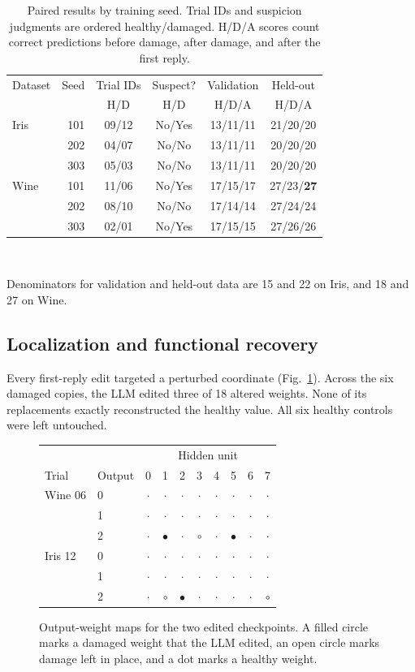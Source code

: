 \documentclass[conference,letterpaper]{IEEEtran}
\begin{document}
\begin{table}[!t]
\caption{Paired results by training seed. Trial IDs and suspicion judgments are ordered healthy/damaged. H/D/A scores count correct predictions before damage, after damage, and after the first reply.}\label{tab:pairs}
\centering\footnotesize\setlength{\tabcolsep}{3pt}
\begin{tabular}{@{}lrcccc@{}}\toprule
Dataset & Seed & Trial IDs & Suspect? & Validation & Held-out\\
 & & H/D & H/D & H/D/A & H/D/A\\\midrule
Iris & 101 & 09/12 & No/Yes & 13/11/11 & 21/20/20\\
 & 202 & 04/07 & No/No & 13/11/11 & 20/20/20\\
 & 303 & 05/03 & No/No & 13/11/11 & 20/20/20\\\midrule
Wine & 101 & 11/06 & No/Yes & 17/15/17 & 27/23/\textbf{27}\\
 & 202 & 08/10 & No/No & 17/14/14 & 27/24/24\\
 & 303 & 02/01 & No/Yes & 17/15/15 & 27/26/26\\\bottomrule
\end{tabular}\\[3pt]
\parbox{\columnwidth}{\footnotesize Denominators for validation and held-out data are 15 and 22 on Iris, and 18 and 27 on Wine.}
\end{table}

\subsection{Localization and functional recovery}
Every first-reply edit targeted a perturbed coordinate (Fig.~\ref{fig:map}). Across the six damaged copies, the LLM edited three of 18 altered weights. None of its replacements exactly reconstructed the healthy value. All six healthy controls were left untouched.

\begin{figure}[!t]
\centering\footnotesize\setlength{\tabcolsep}{4pt}
\newcommand{\A}{\ensuremath{\bullet}}\newcommand{\B}{\ensuremath{\circ}}\newcommand{\Cdot}{\ensuremath{\cdot}}
\begin{tabular}{@{}ll*{8}{c}@{}}\toprule
& & \multicolumn{8}{c}{Hidden unit}\\
Trial & Output & 0&1&2&3&4&5&6&7\\\midrule
Wine 06&0&\Cdot&\Cdot&\Cdot&\Cdot&\Cdot&\Cdot&\Cdot&\Cdot\\
&1&\Cdot&\Cdot&\Cdot&\Cdot&\Cdot&\Cdot&\Cdot&\Cdot\\
&2&\Cdot&\A&\Cdot&\B&\Cdot&\A&\Cdot&\Cdot\\\midrule
Iris 12&0&\Cdot&\Cdot&\Cdot&\Cdot&\Cdot&\Cdot&\Cdot&\Cdot\\
&1&\Cdot&\Cdot&\Cdot&\Cdot&\Cdot&\Cdot&\Cdot&\Cdot\\
&2&\Cdot&\B&\A&\Cdot&\Cdot&\Cdot&\Cdot&\B\\\bottomrule
\end{tabular}
\caption{Output-weight maps for the two edited checkpoints. A filled circle marks a damaged weight that the LLM edited, an open circle marks damage left in place, and a dot marks a healthy weight.}\label{fig:map}
\end{figure}
\end{document}
